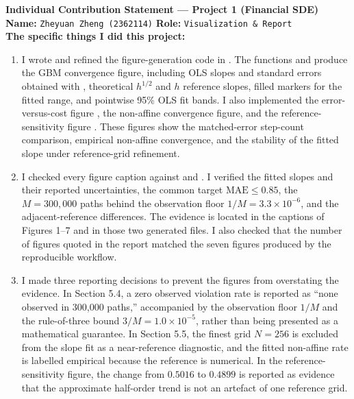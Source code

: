 \documentclass[11pt,a4paper]{article}
\theoremstyle{definition}
\theoremstyle{remark}
\begin{document}
\begin{formbox}
\textbf{Individual Contribution Statement --- Project 1 (Financial SDE)}\\[0.4em]

\textbf{Name:} \texttt{Zheyuan Zheng (2362114)}
\hfill
\textbf{Role:} \texttt{Visualization \& Report}\\[0.4em]

\textbf{The specific things I did this project:}

\begin{enumerate}[leftmargin=2em]

\item I wrote and refined the figure-generation code in
. The functions
 and  produce the
GBM convergence figure, including OLS slopes and standard errors obtained
with , theoretical $h^{1/2}$ and $h$ reference
slopes, filled markers for the fitted range, and pointwise 95\% OLS fit
bands. I also implemented the error-versus-cost figure
, the non-affine convergence figure, and
the reference-sensitivity figure
. These figures show the matched-error
step-count comparison, empirical non-affine convergence, and the stability
of the fitted slope under reference-grid refinement.

\item I checked every figure caption against
 and . I verified
the fitted slopes and their reported uncertainties, the common target
$\mathrm{MAE}\leq0.85$, the $M=300{,}000$ paths behind the observation floor
$1/M=3.3\times10^{-6}$, and the adjacent-reference differences. The evidence
is located in the captions of Figures 1--7 and in those two generated files.
I also checked that the number of figures quoted in the report matched the
seven figures produced by the reproducible workflow.

\item I made three reporting decisions to prevent the figures from
overstating the evidence. In Section 5.4, a zero observed violation rate is
reported as ``none observed in 300,000 paths,'' accompanied by the
observation floor $1/M$ and the rule-of-three bound
$3/M=1.0\times10^{-5}$, rather than being presented as a mathematical
guarantee. In Section 5.5, the finest grid $N=256$ is excluded from the
slope fit as a near-reference diagnostic, and the fitted non-affine rate is
labelled empirical because the reference is numerical. In the
reference-sensitivity figure, the change from $0.5016$ to $0.4899$ is
reported as evidence that the approximate half-order trend is not an
artefact of one reference grid.


\end{enumerate}
\end{formbox}
\end{document}
